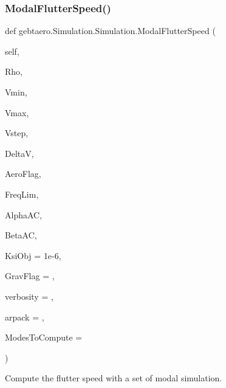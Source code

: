 \subsubsection{\texorpdfstring{Modal\+Flutter\+Speed()}{ModalFlutterSpeed()}}
{\footnotesize\ttfamily def gebtaero.\+Simulation.\+Simulation.\+Modal\+Flutter\+Speed (\begin{DoxyParamCaption}\item[{}]{self,  }\item[{}]{Rho,  }\item[{}]{Vmin,  }\item[{}]{Vmax,  }\item[{}]{Vstep,  }\item[{}]{DeltaV,  }\item[{}]{Aero\+Flag,  }\item[{}]{Freq\+Lim,  }\item[{}]{Alpha\+AC,  }\item[{}]{Beta\+AC,  }\item[{}]{Ksi\+Obj = {\ttfamily 1e-\/6},  }\item[{}]{Grav\+Flag = {},  }\item[{}]{verbosity = {},  }\item[{}]{arpack = {},  }\item[{}]{Modes\+To\+Compute = {} }\end{DoxyParamCaption})}



Compute the flutter speed with a set of modal simulation. 


